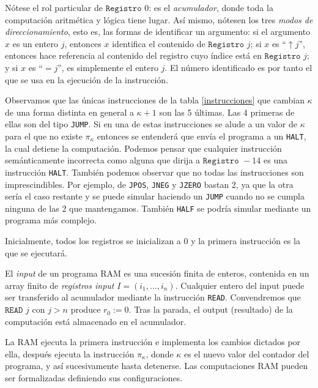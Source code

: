 \documentclass[twoside]{article}
\begin{document}
Nótese el rol particular de $\texttt{Registro }0$: es el \emph{acumulador}, donde toda la computación aritmética y lógica tiene lugar. Así mismo, nótesen los tres \emph{modos de direccionamiento}, esto es, las formas de identificar un argumento: si el argumento $x$ es un entero $j$, entonces $x$ identifica el contenido de $\texttt{Registro }j$; si $x$ es ``$\uparrow j$'', entonces hace referencia al contenido del registro cuyo índice está en $\texttt{Registro }j$; y si $x$ es ``$=j$'', es simplemente el entero $j$. El número identificado es por tanto el que se usa en la ejecución de la instrucción.

Observamos que las únicas instrucciones de la tabla \ref{instrucciones} que cambian $\kappa$ de una forma distinta en general a $\kappa+1$ son las 5 últimas. Las 4 primeras de ellas son del tipo \texttt{JUMP}. Si en una de estas instrucciones se alude a un valor de $\kappa$ para el que no existe $\pi_\kappa$ entonces se entenderá que envía el programa a un \texttt{HALT}, la cual detiene la computación. Podemos pensar que cualquier instrucción semánticamente incorrecta como alguna que dirija a $\texttt{Registro }-14$ es una instrucción \texttt{HALT}.  También podemos observar que no todas las instrucciones son imprescindibles. Por ejemplo, de \texttt{JPOS}, \texttt{JNEG} y \texttt{JZERO} bastan 2, ya que la otra sería el caso restante y se puede simular haciendo un \texttt{JUMP} cuando no se cumpla ninguna de las 2 que mantengamos. También \texttt{HALF} se podría simular mediante un programa más complejo.

Inicialmente, todos los registros se inicializan a 0 y la primera instrucción es la que se ejecutará.

\begin{defi}
El \emph{input} de un programa RAM es una sucesión finita de enteros, contenida en un array finito de \emph{registros input} $I=(i_1,\dots,i_n)$. Cualquier entero del input puede ser transferido al acumulador mediante la instrucción \texttt{READ}. Convendremos que $\texttt{READ }j$ con $j>n$ produce $r_0:=0$. Tras la parada, el output (resultado) de la computación está almacenado en el acumulador. 
\end{defi}


La RAM ejecuta la primera instrucción e implementa los cambios dictados por ella, después ejecuta la instrucción $\pi_\kappa$, donde $\kappa$ es el nuevo valor del contador del programa, y así sucesivamente hasta detenerse. Las computaciones RAM pueden ser formalizadas definiendo sus configuraciones.
\end{document}

